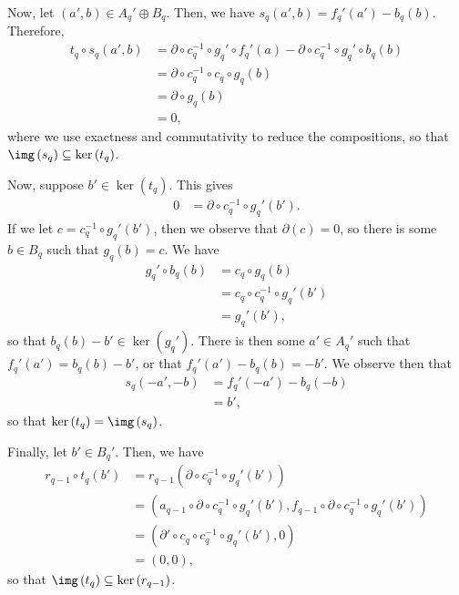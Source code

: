 \documentclass[10pt]{mypackage}
\begin{document}
\begin{solution}
  Now, let $\left( a',b \right)\in A_q'\oplus B_q$. Then, we have $s_q\left( a',b \right) = f_q'\left( a' \right)-b_q(b)$. Therefore,
  \begin{align*}
    t_q\circ s_q\left( a',b \right) &= \partial\circ c_q^{-1}\circ g_q'\circ f_q'\left( a \right) - \partial\circ c_q^{-1}\circ g_q'\circ b_q(b)\\
                                    &= \partial\circ c_q^{-1}\circ c_q\circ g_q(b)\\
                                    &= \partial\circ g_q(b)\\
                                    &= 0,
  \end{align*}
  where we use exactness and commutativity to reduce the compositions, so that $\img\left( s_q \right)\subseteq \ker\left( t_q \right)$.

  Now, suppose $b'\in \ker\left( t_q \right)$. This gives
  \begin{align*}
    0 &= \partial\circ c_{q}^{-1}\circ g_q'\left(b'\right).
  \end{align*}
  If we let $c = c_q^{-1}\circ g_q'\left( b' \right)$, then we observe that $\partial(c) = 0$, so there is some $b\in B_q$ such that $g_q(b) = c$. We have
  \begin{align*}
    g_q'\circ b_q(b) &= c_q\circ g_q(b)\\
                     &= c_q\circ c_q^{-1}\circ g_q'\left( b' \right)\\
                     &= g_q'\left( b' \right),
  \end{align*}
  so that $b_q(b) - b'\in \ker\left( g_q' \right)$. There is then some $a'\in A_q'$ such that $f_q'\left( a' \right) = b_q(b)-b'$, or that $f_q'\left( a' \right)-b_q(b) = -b'$. We observe then that
  \begin{align*}
    s_q\left( -a',-b \right) &= f_q'\left( -a' \right) - b_q\left( -b \right)\\
                             &= b',
  \end{align*}
  so that $\ker\left( t_q \right)= \img\left( s_q \right) $.

  Finally, let $b'\in B_q'$. Then, we have
  \begin{align*}
    r_{q-1}\circ t_q\left( b' \right) &= r_{q-1}\left( \partial\circ c_q^{-1}\circ g_q'\left( b' \right) \right)\\
                                      &= \left( a_{q-1}\circ \partial \circ c_q^{-1}\circ g_q'\left( b' \right),f_{q-1}\circ \partial \circ c_q^{-1}\circ g_q'\left( b' \right) \right)\\
                                      &= \left( \partial'\circ c_q\circ c_q^{-1}\circ g_q'\left( b' \right),0 \right)\\
                                      &= \left( 0,0 \right),
  \end{align*}
  so that $\img\left( t_q \right)\subseteq \ker\left( r_{q-1} \right)$.


\end{solution}
\end{document}

